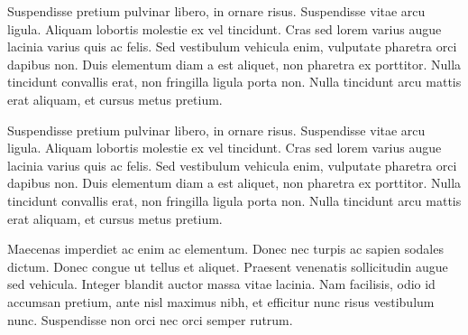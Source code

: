 \documentclass{skripta}
\begin{document}

Suspendisse pretium pulvinar libero, in ornare risus. Suspendisse vitae arcu ligula. Aliquam lobortis molestie ex vel tincidunt. Cras sed lorem varius augue lacinia varius quis ac felis. Sed vestibulum vehicula enim, vulputate pharetra orci dapibus non. Duis elementum diam a est aliquet, non pharetra ex porttitor. Nulla tincidunt convallis erat, non fringilla ligula porta non. Nulla tincidunt arcu mattis erat aliquam, et cursus metus pretium.

Suspendisse pretium pulvinar libero, in ornare risus. Suspendisse vitae arcu ligula. Aliquam lobortis molestie ex vel tincidunt. Cras sed lorem varius augue lacinia varius quis ac felis. Sed vestibulum vehicula enim, vulputate pharetra orci dapibus non. Duis elementum diam a est aliquet, non pharetra ex porttitor. Nulla tincidunt convallis erat, non fringilla ligula porta non. Nulla tincidunt arcu mattis erat aliquam, et cursus metus pretium.

Maecenas imperdiet ac enim ac elementum. Donec nec turpis ac sapien sodales dictum. Donec congue ut tellus et aliquet. Praesent venenatis sollicitudin augue sed vehicula. Integer blandit auctor massa vitae lacinia. Nam facilisis, odio id accumsan pretium, ante nisl maximus nibh, et efficitur nunc risus vestibulum nunc. Suspendisse non orci nec orci semper rutrum.
\end{document}
